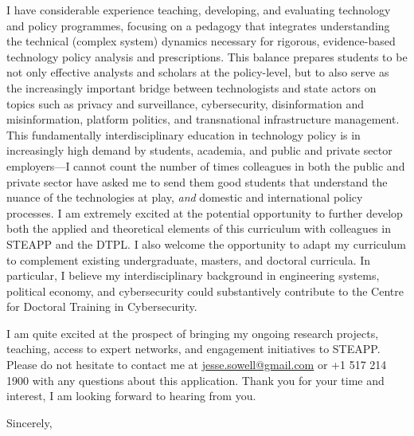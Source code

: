 \documentclass[11pt]{letter}
\begin{document}
\begin{letter}
I have considerable experience teaching, developing, and evaluating technology and policy programmes, focusing on a pedagogy that integrates understanding the technical (complex system) dynamics necessary for rigorous, evidence-based technology policy analysis and prescriptions.
%
This balance prepares students to be not only effective analysts and scholars at the policy-level, but to also serve as the increasingly important bridge between technologists and state actors on topics such as privacy and surveillance, cybersecurity, disinformation and misinformation, platform politics, and transnational infrastructure management.
%
This fundamentally interdisciplinary education in technology policy is in increasingly high demand by students, academia, and public and private sector employers---I cannot count the number of times colleagues in both the public and private sector have asked me to send them good students that understand the nuance of the technologies at play, \emph{and} domestic and international policy processes.
%
I am extremely excited at the potential opportunity to further develop both the applied and theoretical elements of this curriculum with colleagues in  STEAPP and the DTPL.
%
I also welcome the opportunity to adapt my curriculum to complement existing undergraduate, masters, and doctoral curricula.
%
In particular, I believe my interdisciplinary background in engineering systems, political economy, and cybersecurity could substantively contribute to the Centre for Doctoral Training in Cybersecurity. 
%


%
I am quite excited at the prospect of bringing my ongoing research projects, teaching, access to expert networks, and engagement initiatives to STEAPP.
%
Please do not hesitate to contact me at \href{mailto:jesse.sowell@gmail.com}{jesse.sowell@gmail.com} or +1 517 214 1900 with any questions about this application.
%
Thank you for your time and interest, I am looking forward to hearing from you.

\vspace{\baselineskip}



\closing{Sincerely,}




\end{letter}
\end{document}
